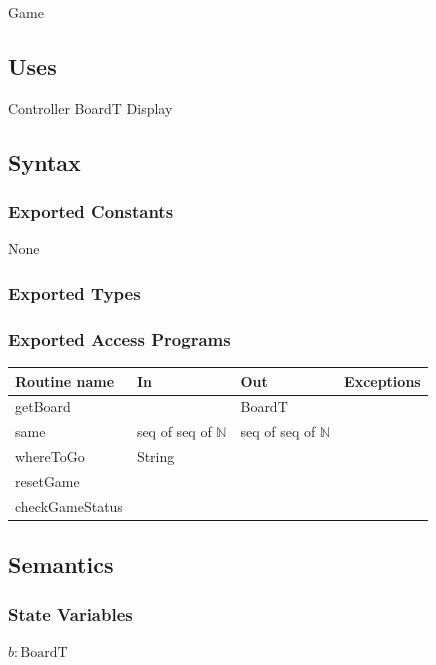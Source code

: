 \documentclass[12pt]{article}
\begin{document}
Game

\subsection* {Uses}

Controller \newline
BoardT \newline
Display
\subsection* {Syntax}

\subsubsection* {Exported Constants}

None

\subsubsection* {Exported Types}


\subsubsection* {Exported Access Programs}

\begin{tabular}{| l | l | l | p{5cm} |}
\hline
\textbf{Routine name} & \textbf{In} & \textbf{Out} & \textbf{Exceptions}\\
\hline
getBoard & & BoardT & \\
same & seq of seq of $\mathbb{N}$ & seq of seq of $\mathbb{N}$ & \\
\hline
whereToGo & String & & ~\\
\hline
resetGame & & & ~\\
\hline
checkGameStatus & & & \\
\hline
\end{tabular}

\subsection* {Semantics}

\subsubsection* {State Variables}

$\mathit{b}: \text{BoardT}$\\
\end{document}
